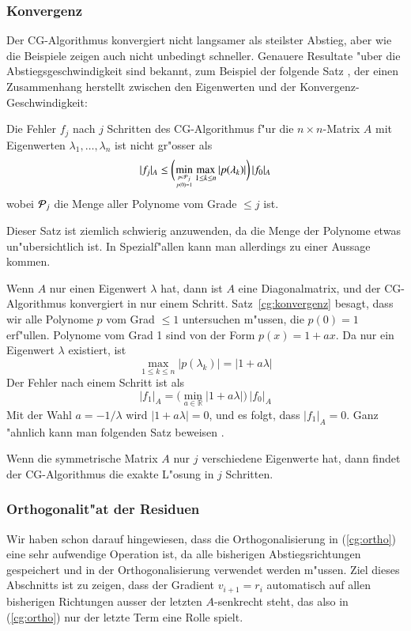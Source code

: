 \subsubsection{Konvergenz}
Der CG-Algorithmus konvergiert nicht langsamer als steilster Abstieg, aber
wie die Beispiele zeigen auch nicht unbedingt schneller.
Genauere Resultate "uber die Abstiegsgeschwindigkeit sind bekannt,
zum Beispiel der folgende Satz \cite[Theorem 8.9.9]{skript:watkins},
der einen Zusammenhang herstellt zwischen den Eigenwerten und der
Konvergenz-Geschwindigkeit:

\begin{satz}
\label{cg:konvergenz}
Die Fehler $f_j$ nach $j$ Schritten des CG-Algorithmus f"ur die
$n\times n$-Matrix $A$
mit Eigenwerten $\lambda_1,\dots,\lambda_n$ ist nicht gr"osser
als
\[
| f_j|_A
\le
\biggl(
\min_{{p\in{\cal P}_j}\atop{p(0)=1}}
\max_{1\le k\le n} |p(\lambda_k)|
\biggr)\,|f_0|_A
\]
wobei ${\cal P}_j$ die Menge aller Polynome vom Grade $\le j$ ist.
\end{satz}

Dieser Satz ist ziemlich schwierig anzuwenden, da die Menge der Polynome
etwas un"ubersichtlich ist.
In Spezialf"allen kann man allerdings zu einer Aussage kommen.

Wenn $A$ nur einen Eigenwert $\lambda$ hat, dann ist $A$ eine Diagonalmatrix,
und der CG-Algorithmus konvergiert in nur einem Schritt.
Satz~\ref{cg:konvergenz} besagt, dass wir alle Polynome $p$ vom Grad
$\le 1$ untersuchen m"ussen, die $p(0)=1$ erf"ullen.
Polynome vom Grad 1 sind von der Form $p(x)=1+ax$.
Da nur ein Eigenwert $\lambda$ existiert, ist 
\[
\max_{1\le k\le n}|p(\lambda_k)|=|1+a\lambda|
\]
Der Fehler nach einem Schritt ist als
\[
|f_1|_A=\bigl(\min_{a\in\mathbb R}|1+a\lambda|\bigr)\,|f_0|_A
\]
Mit der Wahl $a=-1/\lambda$ wird $|1+a\lambda|=0$, und es folgt, dass
$|f_1|_A=0$.
Ganz "ahnlich kann man folgenden Satz beweisen
\cite[Theorem 8.9.12]{skript:watkins}.

\begin{satz}
Wenn die symmetrische Matrix $A$ nur $j$ verschiedene Eigenwerte hat,
dann findet der CG-Algorithmus die exakte L"osung in $j$ Schritten.
\end{satz}

\subsubsection{Orthogonalit"at der Residuen}
Wir haben schon darauf hingewiesen, dass die Orthogonalisierung in
(\ref{cg:ortho}) eine sehr aufwendige Operation ist, da alle bisherigen
Abstiegsrichtungen gespeichert und in der Orthogonalisierung verwendet
werden m"ussen.
Ziel dieses Abschnitts ist zu zeigen, dass der Gradient
$v_{i+1}=r_i$ automatisch auf allen bisherigen Richtungen
ausser der letzten $A$-senkrecht steht,
das also in (\ref{cg:ortho}) nur der letzte Term eine Rolle spielt.

